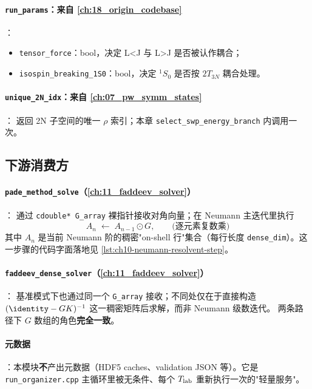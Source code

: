 \paragraph{\texttt{run\_params}：来自 \cref{ch:18_origin_codebase}}：
\begin{itemize}
  \item \texttt{tensor\_force}：bool，决定 L<J 与 L>J 是否被认作耦合；
  \item \texttt{isospin\_breaking\_1S0}：bool，决定 \({}^1S_0\) 是否按
        \(2T_{3N}\) 耦合处理。
\end{itemize}

\paragraph{\texttt{unique\_2N\_idx}：来自 \cref{ch:07_pw_symm_states}}：
返回 2N 子空间的唯一 \(\rho\) 索引；本章 \texttt{select\_swp\_energy\_branch}
内调用一次。

\subsection{下游消费方}
\label{subsec:ch10-downstream}

\paragraph{\texttt{pade\_method\_solve}（\cref{ch:11_faddeev_solver}）}：
通过 \texttt{cdouble* G\_array} 裸指针接收对角向量；在 Neumann 主迭代里执行
\begin{equation}
\label{eq:ch10-Neumann-G-step}
A_n \;\leftarrow\; A_{n-1} \odot G,
\qquad
\text{(逐元素复数乘)}
\end{equation}
其中 \(A_n\) 是当前 Neumann 阶的稠密"on-shell 行"集合（每行长度
\texttt{dense\_dim}）。这一步骤的代码字面落地见
\cref{lst:ch10-neumann-resolvent-step}。

\paragraph{\texttt{faddeev\_dense\_solver}（\cref{ch:11_faddeev_solver}）}：
基准模式下也通过同一个 \texttt{G\_array} 接收；不同处仅在于直接构造
\((\identity - G K)^{-1}\) 这一稠密矩阵后求解，而非 Neumann 级数迭代。
两条路径下 \(G\) 数组的角色\textbf{完全一致}。

\paragraph{元数据}：本模块\textbf{不}产出元数据（HDF5 caches、validation JSON
等）。它是 \texttt{run\_organizer.cpp} 主循环里被无条件、每个 \(T_{\rm lab}\)
重新执行一次的"轻量服务"。

